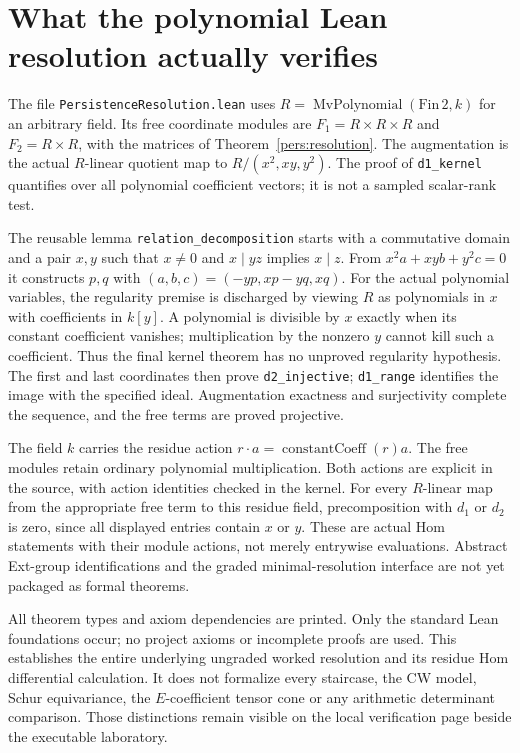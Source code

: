 \section{What the polynomial Lean resolution actually verifies}
The file \texttt{PersistenceResolution.lean} uses
$R=\operatorname{MvPolynomial}(\mathrm{Fin}\,2,k)$ for an arbitrary field.
Its free coordinate modules are $F_1=R\times R\times R$ and
$F_2=R\times R$, with the matrices of Theorem~\ref{pers:resolution}.
The augmentation is the actual $R$-linear quotient map to
$R/(x^2,xy,y^2)$. The proof of \texttt{d1\_kernel} quantifies over
all polynomial coefficient vectors; it is not a sampled scalar-rank test.

The reusable lemma \texttt{relation\_decomposition} starts with a
commutative domain and a pair $x,y$ such that $x\ne0$ and
$x\mid yz$ implies $x\mid z$. From
$x^2a+xyb+y^2c=0$ it constructs $p,q$ with
$(a,b,c)=(-yp,xp-yq,xq)$. For the actual polynomial variables, the
regularity premise is discharged by viewing $R$ as polynomials in $x$
with coefficients in $k[y]$. A polynomial is divisible by $x$ exactly
when its constant coefficient vanishes; multiplication by the nonzero
$y$ cannot kill such a coefficient. Thus the final kernel theorem has
no unproved regularity hypothesis. The first and last coordinates then
prove \texttt{d2\_injective}; \texttt{d1\_range} identifies the image
with the specified ideal. Augmentation exactness and surjectivity complete
the sequence, and the free terms are proved projective.

The field $k$ carries the residue action
$r\cdot a=\operatorname{constantCoeff}(r)a$.
The free modules retain ordinary polynomial multiplication. Both actions
are explicit in the source, with action identities checked in the kernel.
For every $R$-linear map from the appropriate free term to this residue
field, precomposition with $d_1$ or $d_2$ is zero, since all displayed
entries contain $x$ or $y$. These are actual Hom statements with their
module actions, not merely entrywise evaluations. Abstract Ext-group
identifications and the graded minimal-resolution interface are not yet
packaged as formal theorems.

All theorem types and axiom dependencies are printed. Only the standard
Lean foundations occur; no project axioms or incomplete proofs are used.
This establishes the entire underlying ungraded worked resolution and its
residue Hom differential calculation. It does not formalize every staircase,
the CW model, Schur equivariance, the $E$-coefficient tensor cone or any
arithmetic determinant comparison. Those distinctions remain visible on
the local verification page beside the executable laboratory.
